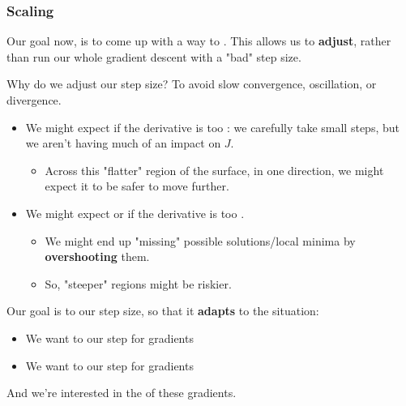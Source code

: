         \subsubsection{Scaling}

            Our goal now, is to come up with a  way to . This allows us to \textbf{adjust}, rather than run our whole gradient descent with a "bad" step size.

            Why do we adjust our step size? To avoid slow convergence, oscillation, or divergence.

            \begin{itemize}
                \item We might expect  if the derivative is too : we carefully take small steps, but we aren't having much of an impact on $J$.

                    \begin{itemize}
                        \item Across this "flatter" region of the surface, in one direction, we might expect it to be safer to move further.
                    \end{itemize}

                \item We might expect  or  if the derivative is too .
                    \begin{itemize}
                        \item We might end up "missing" possible solutions/local minima by \textbf{overshooting} them.
                        \item So, "steeper" regions might be riskier.
                    \end{itemize}
            \end{itemize}

            \begin{concept}
                Our goal is to  our step size, so that it \textbf{adapts} to the situation:

                \begin{itemize}
                    \item We want to  our step for  gradients
                    \item We want to  our step for  gradients
                \end{itemize}

                And we're interested in the  of these gradients.
            \end{concept}


